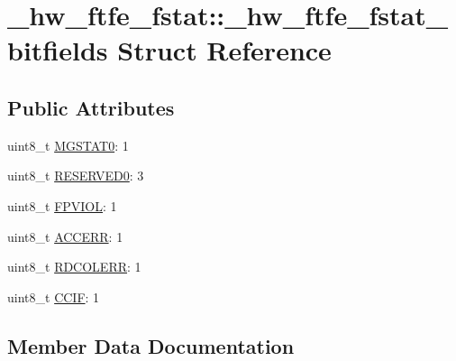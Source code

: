 \hypertarget{struct__hw__ftfe__fstat_1_1__hw__ftfe__fstat__bitfields}{}\section{\+\_\+hw\+\_\+ftfe\+\_\+fstat\+:\+:\+\_\+hw\+\_\+ftfe\+\_\+fstat\+\_\+bitfields Struct Reference}
\label{struct__hw__ftfe__fstat_1_1__hw__ftfe__fstat__bitfields}
\subsection*{Public Attributes}
\begin{DoxyCompactItemize}
\item 
uint8\+\_\+t \hyperlink{struct__hw__ftfe__fstat_1_1__hw__ftfe__fstat__bitfields_a6a00d5518d472e08b63c91f6530f908e}{M\+G\+S\+T\+A\+T0}\+: 1
\item 
uint8\+\_\+t \hyperlink{struct__hw__ftfe__fstat_1_1__hw__ftfe__fstat__bitfields_a4b05ce70056e3e21add09b4316d36d9c}{R\+E\+S\+E\+R\+V\+E\+D0}\+: 3
\item 
uint8\+\_\+t \hyperlink{struct__hw__ftfe__fstat_1_1__hw__ftfe__fstat__bitfields_a2a8f28562c0e7ef3e60ef1a0332bd985}{F\+P\+V\+I\+OL}\+: 1
\item 
uint8\+\_\+t \hyperlink{struct__hw__ftfe__fstat_1_1__hw__ftfe__fstat__bitfields_ad880388613f7dd8216ffb30c09a1e48e}{A\+C\+C\+E\+RR}\+: 1
\item 
uint8\+\_\+t \hyperlink{struct__hw__ftfe__fstat_1_1__hw__ftfe__fstat__bitfields_a4f6b93f9f5dc5cb066478ac0e709820a}{R\+D\+C\+O\+L\+E\+RR}\+: 1
\item 
uint8\+\_\+t \hyperlink{struct__hw__ftfe__fstat_1_1__hw__ftfe__fstat__bitfields_af1b0964b4cd4341f6d0e4d8f01766ed7}{C\+C\+IF}\+: 1
\end{DoxyCompactItemize}


\subsection{Member Data Documentation}
